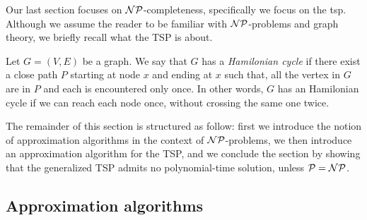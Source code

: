 \documentclass{subfiles}
\begin{document}
    Our last section focuses on \(\operatorname{\mathcal{NP}}\)-completeness, specifically we focus on the \gls{tsp}.
        Although we assume the reader to be familiar with \(\operatorname{\mathcal{NP}}\)-problems and graph theory,
        we briefly recall what the TSP is about.

    Let \(G = (V, E)\) be a graph. We say that \(G\) has a \emph{Hamilonian cycle} if 
        there exist a close path \(P\) starting at node \(x\) and ending at \(x\) such that,
        all the vertex in \(G\) are in \(P\) and each is encountered only once.
        In other words, \(G\) has an Hamilonian cycle if we can reach each node once,
        without crossing the same one twice.

    The remainder of this section is structured as follow: 
        first we introduce the notion of approximation algorithms in the context of \(\operatorname{\mathcal{NP}}\)-problems,
        we then introduce an approximation algorithm for the TSP,
        and we conclude the section by showing that the generalized TSP admits no polynomial-time 
        solution, unless \(\mathcal{P} = \operatorname{\mathcal{NP}}\).

    \subsection{Approximation algorithms}
    
\end{document}
